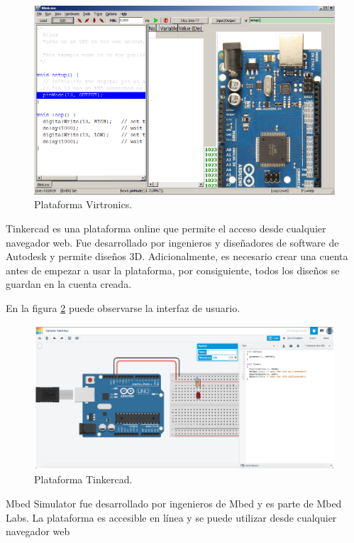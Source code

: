 \begin{figure}[ht]
	\centering
	\includegraphics[scale=.35]{./Figures/Virtronics.png}
	\caption{Plataforma Virtronics.}
	\label{fig:Virtronics}
\end{figure}


Tinkercad \citep{Tinkercad} es una plataforma online que permite el acceso desde cualquier navegador web. Fue desarrollado por ingenieros y diseñadores de software de Autodesk \citep{Autodesk} y permite diseños 3D. Adicionalmente, es necesario crear una cuenta  antes de empezar a usar la plataforma, por consiguiente, todos los diseños se guardan en la cuenta creada.

En la figura \ref{fig:Tinkercad} puede observarse la interfaz de usuario.

\begin{figure}[ht]
	\centering
	\includegraphics[scale=.42]{./Figures/Tinkercad.png}
	\caption{Plataforma Tinkercad.}
	\label{fig:Tinkercad}
\end{figure}


Mbed Simulator \citep{ArmMbedSim} fue desarrollado por ingenieros de Mbed \citep{ArmMbed} y es parte de Mbed Labs. La plataforma es accesible en línea y se puede utilizar desde cualquier navegador web

